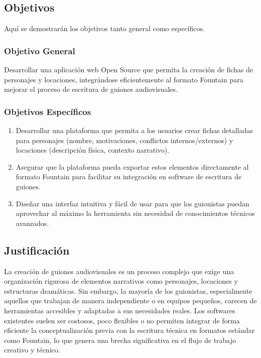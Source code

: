 \documentclass[12pt]{article}
\begin{document}
	\newpage

	\subsection{Objetivos}

	Aquí se demostrarán los objetivos tanto general como específicos.

	\subsubsection{Objetivo General}
	Desarrollar una aplicación web Open Source que permita la creación de fichas de personajes y locaciones, integrándose eficientemente al formato Fountain para mejorar el proceso de escritura de guiones audiovisuales.

	\subsubsection{Objetivos Específicos}
	\begin{enumerate}
		\item Desarrollar una plataforma que permita a los usuarios crear fichas detalladas para personajes (nombre, motivaciones, conflictos internos/externos) y locaciones (descripción física, contexto narrativo).
		\item Asegurar que la plataforma pueda exportar estos elementos directamente al formato Fountain para facilitar su integración en software de escritura de guiones.
		\item Diseñar una interfaz intuitiva y fácil de usar para que los guionistas puedan aprovechar al máximo la herramienta sin necesidad de conocimientos técnicos avanzados.
	\end{enumerate}

	\newpage

	\subsection{Justificación}

	La creación de guiones audiovisuales es un proceso complejo que exige una organización rigurosa de elementos narrativos como personajes, locaciones y estructuras dramáticas. Sin embargo, la mayoría de los guionistas, especialmente aquellos que trabajan de manera independiente o en equipos pequeños, carecen de herramientas accesibles y adaptadas a sus necesidades reales. Los softwares existentes suelen ser costosos, poco flexibles o no permiten integrar de forma eficiente la conceptualización previa con la escritura técnica en formatos estándar como Fountain, lo que genera una brecha significativa en el flujo de trabajo creativo y técnico.\\
\end{document}

